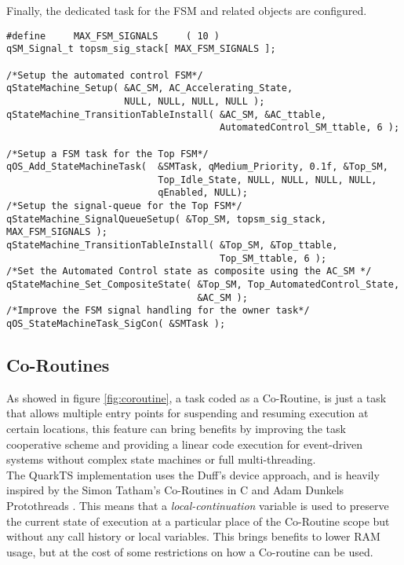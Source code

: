 Finally, the dedicated task for the FSM and related objects are configured.

\begin{lstlisting}[style=CStyle]
#define     MAX_FSM_SIGNALS     ( 10 )
qSM_Signal_t topsm_sig_stack[ MAX_FSM_SIGNALS ];

/*Setup the automated control FSM*/
qStateMachine_Setup( &AC_SM, AC_Accelerating_State, 
                     NULL, NULL, NULL, NULL );
qStateMachine_TransitionTableInstall( &AC_SM, &AC_ttable, 
                                      AutomatedControl_SM_ttable, 6 );

/*Setup a FSM task for the Top FSM*/    
qOS_Add_StateMachineTask(  &SMTask, qMedium_Priority, 0.1f, &Top_SM, 
                           Top_Idle_State, NULL, NULL, NULL, NULL, 
                           qEnabled, NULL); 
/*Setup the signal-queue for the Top FSM*/
qStateMachine_SignalQueueSetup( &Top_SM, topsm_sig_stack, MAX_FSM_SIGNALS );
qStateMachine_TransitionTableInstall( &Top_SM, &Top_ttable, 
                                      Top_SM_ttable, 6 );
/*Set the Automated Control state as composite using the AC_SM */
qStateMachine_Set_CompositeState( &Top_SM, Top_AutomatedControl_State, 
                                  &AC_SM );
/*Improve the FSM signal handling for the owner task*/
qOS_StateMachineTask_SigCon( &SMTask );
\end{lstlisting}

\subsection{Co-Routines}
As showed in figure \ref{fig:coroutine}, a task coded as a Co-Routine, is just a task that allows multiple entry points for suspending and resuming execution at certain locations, this feature can bring benefits by improving the task cooperative scheme and providing a linear code execution for event-driven systems without complex state machines or full multi-threading. \\


    
The QuarkTS implementation uses the Duff's device approach, and is heavily inspired by the Simon Tatham's Co-Routines in C \cite{tatham} and Adam Dunkels Protothreads \cite{dunkels}. This means that a \textit{local-continuation} variable is used to preserve the current state of execution at a particular place of the Co-Routine scope but without any call history or local variables. This brings benefits to lower RAM usage, but at the cost of some restrictions on how a Co-routine can be used. \\

